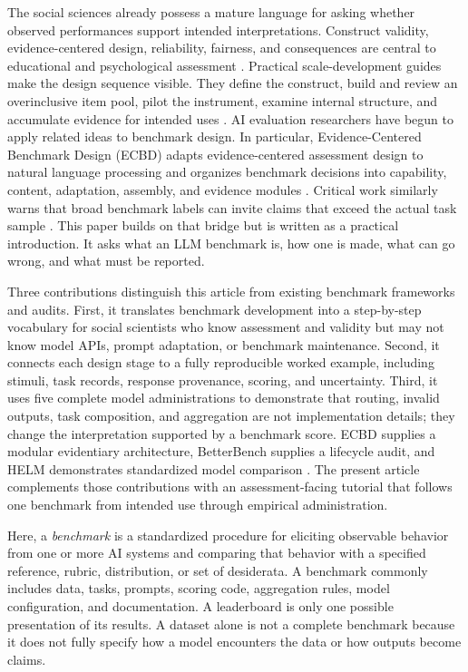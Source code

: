 \documentclass[12pt]{article}
\begin{document}
The social sciences already possess a mature language for asking whether observed performances support intended interpretations. Construct validity, evidence-centered design, reliability, fairness, and consequences are central to educational and psychological assessment \citep{cronbach1955construct,messick1989validity,aera2014standards,kane2013validating,mislevy2003ecd}. Practical scale-development guides make the design sequence visible. They define the construct, build and review an overinclusive item pool, pilot the instrument, examine internal structure, and accumulate evidence for intended uses \citep{clarkwatson2019,boateng2018,hinkin1998,simms2008}. AI evaluation researchers have begun to apply related ideas to benchmark design. In particular, Evidence-Centered Benchmark Design (ECBD) adapts evidence-centered assessment design to natural language processing and organizes benchmark decisions into capability, content, adaptation, assembly, and evidence modules \citep{liu2024ecbd}. Critical work similarly warns that broad benchmark labels can invite claims that exceed the actual task sample \citep{raji2021everything}. This paper builds on that bridge but is written as a practical introduction. It asks what an LLM benchmark is, how one is made, what can go wrong, and what must be reported.

Three contributions distinguish this article from existing benchmark frameworks and audits. First, it translates benchmark development into a step-by-step vocabulary for social scientists who know assessment and validity but may not know model APIs, prompt adaptation, or benchmark maintenance. Second, it connects each design stage to a fully reproducible worked example, including stimuli, task records, response provenance, scoring, and uncertainty. Third, it uses five complete model administrations to demonstrate that routing, invalid outputs, task composition, and aggregation are not implementation details; they change the interpretation supported by a benchmark score. ECBD supplies a modular evidentiary architecture, BetterBench supplies a lifecycle audit, and HELM demonstrates standardized model comparison \citep{liu2024ecbd,reuel2024betterbench,liang2022helm}. The present article complements those contributions with an assessment-facing tutorial that follows one benchmark from intended use through empirical administration.

Here, a \emph{benchmark} is a standardized procedure for eliciting observable behavior from one or more AI systems and comparing that behavior with a specified reference, rubric, distribution, or set of desiderata. A benchmark commonly includes data, tasks, prompts, scoring code, aggregation rules, model configuration, and documentation. A leaderboard is only one possible presentation of its results. A dataset alone is not a complete benchmark because it does not fully specify how a model encounters the data or how outputs become claims.
\end{document}

